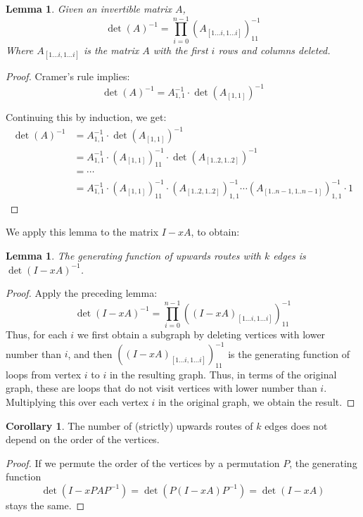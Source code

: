 \documentclass[a4paper, 11pt]{article}
\newtheorem{lemma}[theorem]{Lemma}
\theoremstyle{definition}
\newtheorem{corollary}{Corollary}[theorem]
\begin{document}
\begin{lemma} Given an invertible matrix $A$,
  \[ \det(A)^{-1} = \prod_{i=0}^{n-1} (A_{[1\dots i, 1\dots i]})^{-1}_{11} \]
Where $A_{[1\dots i, 1\dots i]}$ is the matrix $A$ with the first $i$ rows and columns deleted.
\end{lemma}
\begin{proof}
  Cramer's rule implies:
\[
  \det(A)^{-1} = A^{-1}_{1,1} \cdot \det(A_{[1,1]})^{-1}
\]

Continuing this by induction, we get:
\begin{align*}
  \det(A)^{-1} &= A^{-1}_{1,1} \cdot \det(A_{[1,1]})^{-1} \\
    &= A^{-1}_{1,1} \cdot (A_{[1,1]})^{-1}_{11} \cdot \det(A_{[1..2,1..2]})^{-1} \\
    &= \cdots \\
    &= A^{-1}_{1,1} \cdot (A_{[1,1]})^{-1}_{11} \cdot (A_{[1..2,1..2]})^{-1}_{1,1} \cdots
        (A_{[1..n-1,1..n-1]})^{-1}_{1,1} \cdot 1
\end{align*}
\end{proof}

We apply this lemma to the matrix $I - xA$, to obtain:

\begin{lemma}
  The generating function of upwards routes with $k$ edges is $\det(I - xA)^{-1}$.
\end{lemma}
\begin{proof}
  Apply the preceding lemma:
  \[ \det(I - xA)^{-1} = \prod_{i=0}^{n-1} ((I - xA)_{[1\dots i, 1\dots i]})^{-1}_{11} \]
  Thus, for each $i$ we first obtain a subgraph by deleting vertices with lower number than $i$, and then $((I - xA)_{[1\dots i, 1\dots i]})^{-1}_{11}$ is the generating function of loops from vertex $i$ to $i$ in the resulting graph. Thus, in terms of the original graph, these are loops that do not visit vertices with lower number than $i$. Multiplying this over each vertex $i$ in the original graph, we obtain the result.
\end{proof}

\begin{corollary}
  The number of (strictly) upwards routes of $k$ edges does not depend on the order of the vertices.
\end{corollary}
\begin{proof}
  If we permute the order of the vertices by a permutation $P$, the generating function
  \[
    \det(I - xPAP^{-1}) = \det(P(I - xA)P^{-1}) = \det(I - xA)
  \] stays the same.
\end{proof}
\end{document}
